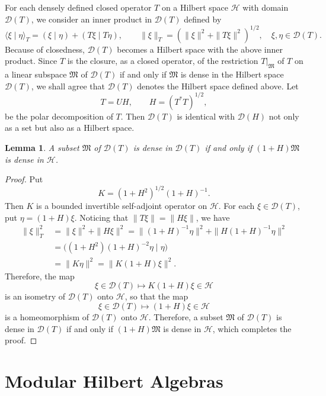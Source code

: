 \documentclass[12pt,b5paper,twoside]{article}
\theoremstyle{takesaki}
\newtheorem{lemma}{Lemma}[section]
\numberwithin{equation}{section}
\begin{document}
For each densely defined closed operator $T$ on a Hilbert space
$\mathcal H$ with domain $\mathcal D(T)$, we consider an inner product in
$\mathcal D(T)$ defined by
\[
  \langle\xi\mid\eta\rangle_T=(\xi\mid\eta)+(T\xi\mid T\eta),
  \qquad
  \|\xi\|_T=(\|\xi\|^2+\|T\xi\|^2)^{1/2},
  \quad \xi,\eta\in\mathcal D(T).
\]
Because of closedness, $\mathcal D(T)$ becomes a Hilbert space with the
above inner product.  Since $T$ is the closure, as a closed operator, of
the restriction $T|_{\mathfrak M}$ of $T$ on a linear subspace
$\mathfrak M$ of $\mathcal D(T)$ if and only if $\mathfrak M$ is dense
in the Hilbert space $\mathcal D(T)$, we shall agree that
$\mathcal D(T)$ denotes the Hilbert space defined above.  Let
\[
  T=UH,\qquad H=(T^*T)^{1/2},
\]
be the polar decomposition of $T$.  Then $\mathcal D(T)$ is identical
with $\mathcal D(H)$ not only as a set but also as a Hilbert space.

\begin{lemma}\label{lem:1.1}
A subset $\mathfrak M$ of $\mathcal D(T)$ is dense in $\mathcal D(T)$ if
and only if $(1+H)\mathfrak M$ is dense in $\mathcal H$.
\end{lemma}

\begin{proof}
Put
\[
  K=(1+H^2)^{1/2}(1+H)^{-1}.
\]
Then $K$ is a bounded invertible self-adjoint operator on $\mathcal H$.
For each $\xi\in\mathcal D(T)$, put $\eta=(1+H)\xi$.  Noticing that
$\|T\xi\|=\|H\xi\|$, we have
\begin{align*}
  \|\xi\|_T^2
    &=\|\xi\|^2+\|H\xi\|^2
      =\|(1+H)^{-1}\eta\|^2
       +\|H(1+H)^{-1}\eta\|^2 \\
    &=\bigl((1+H^2)(1+H)^{-2}\eta\mid\eta\bigr) \\
    &=\|K\eta\|^2
      =\|K(1+H)\xi\|^2.
\end{align*}
Therefore, the map
\[
  \xi\in\mathcal D(T)\longmapsto K(1+H)\xi\in\mathcal H
\]
is an isometry of $\mathcal D(T)$ onto $\mathcal H$, so that the map
\[
  \xi\in\mathcal D(T)\longmapsto(1+H)\xi\in\mathcal H
\]
is a homeomorphism of $\mathcal D(T)$ onto $\mathcal H$.  Therefore, a
subset $\mathfrak M$ of $\mathcal D(T)$ is dense in $\mathcal D(T)$ if
and only if $(1+H)\mathfrak M$ is dense in $\mathcal H$, which completes
the proof.
\end{proof}

\section{Modular Hilbert Algebras}\label{sec:2}
\end{document}
